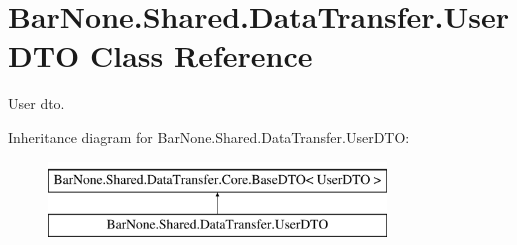 \hypertarget{class_bar_none_1_1_shared_1_1_data_transfer_1_1_user_d_t_o}{}\section{Bar\+None.\+Shared.\+Data\+Transfer.\+User\+D\+TO Class Reference}
\label{class_bar_none_1_1_shared_1_1_data_transfer_1_1_user_d_t_o}


User dto.  


Inheritance diagram for Bar\+None.\+Shared.\+Data\+Transfer.\+User\+D\+TO\+:\begin{figure}[H]
\begin{center}
\leavevmode
\includegraphics[height=2.000000cm]{class_bar_none_1_1_shared_1_1_data_transfer_1_1_user_d_t_o}
\end{center}
\end{figure}
